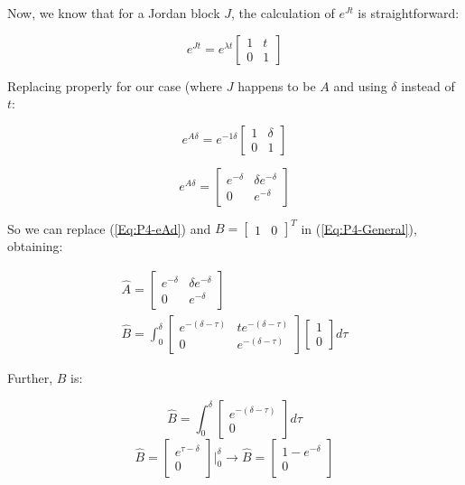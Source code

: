 \documentclass[10pt,a4paper]{article}
\begin{document}
Now, we know that for a Jordan block $J$, the calculation of $e^{Jt}$ is straightforward:

\[ e^{Jt} = e^{\lambda t}\begin{bmatrix}1 & t \\ 0 & 1 \end{bmatrix} \]

Replacing properly for our case (where $J$ happens to be $A$ and using $\delta$ instead of $t$:

\[ e^{A\delta} = e^{-1\delta}\begin{bmatrix}1 & \delta \\ 0 & 1 \end{bmatrix} \]

\begin{equation} 
e^{A\delta} = \begin{bmatrix}e^{-\delta} & \delta e^{-\delta} \\ 0 & e^{-\delta} \end{bmatrix} 
\label{Eq:P4-eAd}
\end{equation}

So we can replace (\ref{Eq:P4-eAd})  and $B = \begin{bmatrix} 1 & 0 \end{bmatrix}^{T}$ in (\ref{Eq:P4-General}), obtaining:

\[
\begin{matrix}
\hat{A} = \begin{bmatrix}e^{-\delta} & \delta e^{-\delta} \\ 0 & e^{-\delta} \end{bmatrix}  \\
\hat{B} = \displaystyle \int_{0}^{\delta} \begin{bmatrix}e^{-(\delta - \tau)} & te^{-(\delta - \tau)} \\ 0 & e^{-(\delta - \tau)} \end{bmatrix}\begin{bmatrix} 1 \\ 0 \end{bmatrix}d\tau 
\end{matrix}
\]

Further, $B$ is:

\[ \hat{B} = \displaystyle \int_{0}^{\delta} \begin{bmatrix}e^{-(\delta - \tau)} \\ 0\end{bmatrix}d\tau \]
\[ \hat{B} = \begin{bmatrix}e^{\tau - \delta} \\ 0\end{bmatrix} \Bigg |_{0}^{\delta} \rightarrow \hat{B} = \begin{bmatrix} 1 - e^{-\delta} \\ 0\end{bmatrix}  \]
\end{document}
